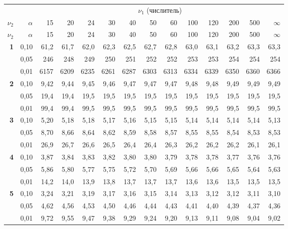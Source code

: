 \documentclass[12pt,a4paper]{article}
\begin{document}
{\footnotesize
\setlength{\tabcolsep}{2pt}
\begin{longtable}{@{\extracolsep{\fill}}rrrrrrrrrrrrrr@{}}
\toprule
& & \multicolumn{12}{c}{$\nu_1$ (числитель)} \\
$\nu_2$ & $\alpha$ & 15 & 20 & 24 & 30 & 40 & 50 & 60 & 100 & 120 & 200 & 500 & $\infty$ \\
\midrule
\endfirsthead
\toprule
$\nu_2$ & $\alpha$ & 15 & 20 & 24 & 30 & 40 & 50 & 60 & 100 & 120 & 200 & 500 & $\infty$ \\
\midrule
\endhead
\bottomrule
\endfoot
\textbf{1} & 0,10 & 61,2 & 61,7 & 62,0 & 62,3 & 62,5 & 62,7 & 62,8 & 63,0 & 63,1 & 63,2 & 63,3 & 63,3 \\*
 & 0,05 & 246 & 248 & 249 & 250 & 251 & 252 & 252 & 253 & 253 & 254 & 254 & 254 \\*
 & 0,01 & 6157 & 6209 & 6235 & 6261 & 6287 & 6303 & 6313 & 6334 & 6339 & 6350 & 6360 & 6366 \\
\addlinespace[1pt]
\textbf{2} & 0,10 & 9,42 & 9,44 & 9,45 & 9,46 & 9,47 & 9,47 & 9,47 & 9,48 & 9,48 & 9,49 & 9,49 & 9,49 \\*
 & 0,05 & 19,4 & 19,4 & 19,5 & 19,5 & 19,5 & 19,5 & 19,5 & 19,5 & 19,5 & 19,5 & 19,5 & 19,5 \\*
 & 0,01 & 99,4 & 99,4 & 99,5 & 99,5 & 99,5 & 99,5 & 99,5 & 99,5 & 99,5 & 99,5 & 99,5 & 99,5 \\
\addlinespace[1pt]
\textbf{3} & 0,10 & 5,20 & 5,18 & 5,18 & 5,17 & 5,16 & 5,15 & 5,15 & 5,14 & 5,14 & 5,14 & 5,14 & 5,13 \\*
 & 0,05 & 8,70 & 8,66 & 8,64 & 8,62 & 8,59 & 8,58 & 8,57 & 8,55 & 8,55 & 8,54 & 8,53 & 8,53 \\*
 & 0,01 & 26,9 & 26,7 & 26,6 & 26,5 & 26,4 & 26,4 & 26,3 & 26,2 & 26,2 & 26,2 & 26,1 & 26,1 \\
\addlinespace[1pt]
\textbf{4} & 0,10 & 3,87 & 3,84 & 3,83 & 3,82 & 3,80 & 3,80 & 3,79 & 3,78 & 3,78 & 3,77 & 3,76 & 3,76 \\*
 & 0,05 & 5,86 & 5,80 & 5,77 & 5,75 & 5,72 & 5,70 & 5,69 & 5,66 & 5,66 & 5,65 & 5,64 & 5,63 \\*
 & 0,01 & 14,2 & 14,0 & 13,9 & 13,8 & 13,7 & 13,7 & 13,7 & 13,6 & 13,6 & 13,5 & 13,5 & 13,5 \\
\addlinespace[1pt]
\textbf{5} & 0,10 & 3,24 & 3,21 & 3,19 & 3,17 & 3,16 & 3,15 & 3,14 & 3,13 & 3,12 & 3,12 & 3,11 & 3,10 \\*
 & 0,05 & 4,62 & 4,56 & 4,53 & 4,50 & 4,46 & 4,44 & 4,43 & 4,41 & 4,40 & 4,39 & 4,37 & 4,36 \\*
 & 0,01 & 9,72 & 9,55 & 9,47 & 9,38 & 9,29 & 9,24 & 9,20 & 9,13 & 9,11 & 9,08 & 9,04 & 9,02 \\

\end{longtable}}
\end{document}

